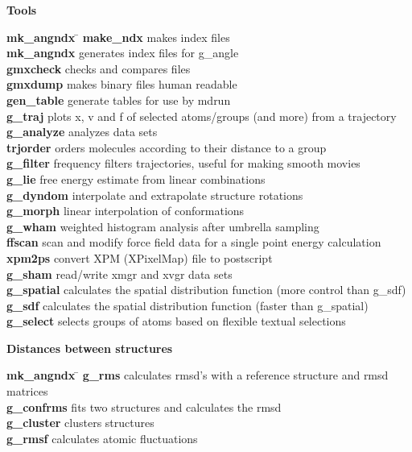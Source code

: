 \begin{description}
\item {\large\bf Tools}
\vspace{-2ex}\begin{tabbing}
{\bf mk\_angndx} \= \kill
{\bf make\_ndx} \> makes index files \\
{\bf mk\_angndx} \> generates index files for g\_angle \\
{\bf gmxcheck} \> checks and compares files \\
{\bf gmxdump} \> makes binary files human readable \\
{\bf gen\_table} \> generate tables for use by mdrun \\
{\bf g\_traj} \> plots x, v and f of selected atoms/groups (and more) from a trajectory \\
{\bf g\_analyze} \> analyzes data sets \\
{\bf trjorder} \> orders molecules according to their distance to a group \\
{\bf g\_filter} \> frequency filters trajectories, useful for making smooth movies \\
{\bf g\_lie} \> free energy estimate from linear combinations \\
{\bf g\_dyndom} \> interpolate and extrapolate structure rotations \\
{\bf g\_morph} \> linear interpolation of conformations  \\
{\bf g\_wham} \> weighted histogram analysis after umbrella sampling \\
{\bf ffscan} \> scan and modify force field data for a single point energy calculation \\
{\bf xpm2ps} \> convert XPM (XPixelMap) file to postscript \\
{\bf g\_sham} \> read/write xmgr and xvgr data sets \\
{\bf g\_spatial} \> calculates the spatial distribution function (more control than g\_sdf) \\
{\bf g\_sdf} \> calculates the spatial distribution function (faster than g\_spatial) \\
{\bf g\_select} \> selects groups of atoms based on flexible textual selections \\
\end{tabbing}\vspace{-2ex}

\item {\large\bf Distances between structures}
\vspace{-2ex}\begin{tabbing}
{\bf mk\_angndx} \= \kill
{\bf g\_rms} \> calculates rmsd's with a reference structure and rmsd matrices \\
{\bf g\_confrms} \> fits two structures and calculates the rmsd  \\
{\bf g\_cluster} \> clusters structures \\
{\bf g\_rmsf} \> calculates atomic fluctuations \\
\end{tabbing}\vspace{-2ex}


\end{description}

